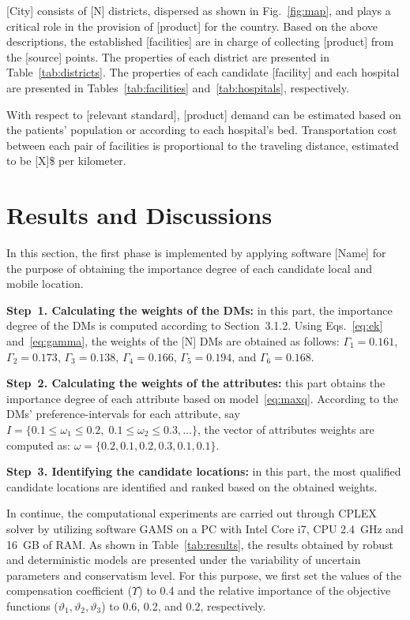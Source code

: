 \documentclass[10pt,twocolumn]{article}
\begin{document}
[City] consists of [N] districts, dispersed as shown in
Fig.~\ref{fig:map}, and plays a critical role in the provision of
[product] for the country. Based on the above descriptions, the
established [facilities] are in charge of collecting [product] from
the [source] points. The properties of each district are presented
in Table~\ref{tab:districts}. The properties of each candidate
[facility] and each hospital are presented in
Tables~\ref{tab:facilities} and~\ref{tab:hospitals}, respectively.

With respect to [relevant standard], [product] demand can be
estimated based on the patients' population or according to each
hospital's bed. Transportation cost between each pair of facilities
is proportional to the traveling distance, estimated to be [X]\$ per
kilometer.

\section{Results and Discussions}

In this section, the first phase is implemented by applying software
[Name] for the purpose of obtaining the importance degree of each
candidate local and mobile location.

\textbf{Step~1. Calculating the weights of the DMs:} in this part,
the importance degree of the DMs is computed according to
Section~3.1.2. Using Eqs.~\eqref{eq:ek} and~\eqref{eq:gamma}, the
weights of the [N] DMs are obtained as follows:
$\Gamma_1 = 0.161$, $\Gamma_2 = 0.173$, $\Gamma_3 = 0.138$,
$\Gamma_4 = 0.166$, $\Gamma_5 = 0.194$, and $\Gamma_6 = 0.168$.

\textbf{Step~2. Calculating the weights of the attributes:} this
part obtains the importance degree of each attribute based on
model~\eqref{eq:maxq}. According to the DMs' preference-intervals
for each attribute, say $I = \{0.1 \le \omega_1 \le 0.2,\;
0.1 \le \omega_2 \le 0.3, \ldots\}$, the vector of attributes
weights are computed as: $\omega = \{0.2, 0.1, 0.2, 0.3, 0.1, 0.1\}$.

\textbf{Step~3. Identifying the candidate locations:} in this part,
the most qualified candidate locations are identified and ranked
based on the obtained weights.

In continue, the computational experiments are carried out through
CPLEX solver by utilizing software GAMS on a PC with Intel Core i7,
CPU 2.4~GHz and 16~GB of RAM. As shown in Table~\ref{tab:results},
the results obtained by robust and deterministic models are
presented under the variability of uncertain parameters and
conservatism level. For this purpose, we first set the values of
the compensation coefficient ($\Upsilon$) to 0.4 and the relative
importance of the objective functions ($\vartheta_1, \vartheta_2,
\vartheta_3$) to 0.6, 0.2, and 0.2, respectively.
\end{document}
